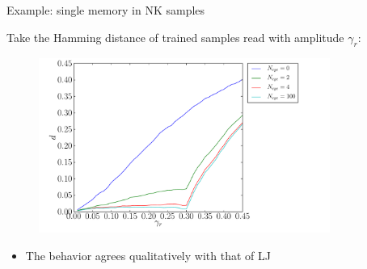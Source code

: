 \documentclass[compress]{beamer}
\begin{document}
	\begin{frame}{Example: single memory in NK samples}

		Take the Hamming distance of trained samples read with amplitude $\gamma_{r}$:

		\begin{figure}
			\includegraphics[width=0.85\textwidth]{Graphics/Graphs/MemoryNKSingle}
		\end{figure}
		
		\begin{itemize}
			\item The behavior agrees qualitatively with that of LJ
		\end{itemize}
		
	\end{frame}	
\end{document}
